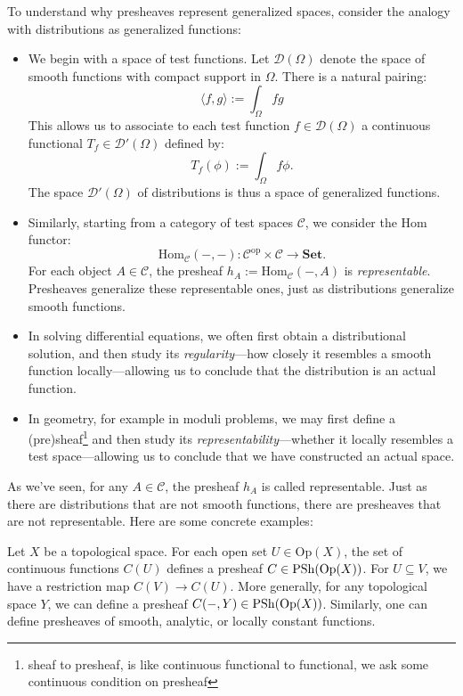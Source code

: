 \begin{remark}
To understand why presheaves represent generalized spaces, consider the analogy with distributions as generalized functions:
\begin{itemize}
    \item We begin with a space of test functions. Let $\mathcal{D}(\Omega)$ denote the space of smooth functions with compact support in $\Omega$. There is a natural pairing:
    \[
    \langle f, g \rangle := \int_\Omega f g
    \]
    This allows us to associate to each test function $f \in \mathcal{D}(\Omega)$ a continuous functional $T_f \in \mathcal{D}'(\Omega)$ defined by:
    \[
    T_f(\phi) := \int_\Omega f \phi.
    \]
    The space $\mathcal{D}'(\Omega)$ of distributions is thus a space of generalized functions.

    \item Similarly, starting from a category of test spaces $\mathcal{C}$, we consider the Hom functor:
    \[
    \mathrm{Hom}_{\mathcal{C}}(-, -): \mathcal{C}^{\mathrm{op}} \times \mathcal{C} \to \mathbf{Set}.
    \]
    For each object $A \in \mathcal{C}$, the presheaf $h_A := \mathrm{Hom}_{\mathcal{C}}(-, A)$ is \emph{representable}. Presheaves generalize these representable ones, just as distributions generalize smooth functions.

    \item In solving differential equations, we often first obtain a distributional solution, and then study its \emph{regularity}—how closely it resembles a smooth function locally—allowing us to conclude that the distribution is an actual function.

    \item In geometry, for example in moduli problems, we may first define a (pre)sheaf\footnote{sheaf to presheaf, is like continuous functional to functional, we ask some continuous condition on presheaf} and then study its \emph{representability}—whether it locally resembles a test space—allowing us to conclude that we have constructed an actual space.
\end{itemize}
\end{remark}

As we've seen, for any $A \in \mathcal{C}$, the presheaf $h_A$ is called representable. Just as there are distributions that are not smooth functions, there are presheaves that are not representable. Here are some concrete examples:

\begin{example}
Let $X$ be a topological space. For each open set $U \in \mathrm{Op}(X)$, the set of continuous functions $C(U)$ defines a presheaf $C \in \mathrm{PSh}(\mathrm{Op}(X))$. For $U \subseteq V$, we have a restriction map $C(V) \to C(U)$. More generally, for any topological space $Y$, we can define a presheaf $C(-, Y) \in \mathrm{PSh}(\mathrm{Op}(X))$. Similarly, one can define presheaves of smooth, analytic, or locally constant functions.
\end{example}

